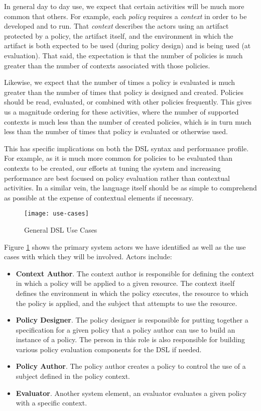 In general day to day use, we expect that certain activities will be much more common that others.  For example, each \emph{policy} requires a \emph{context} in order to be developed and to run.  That \emph{context} describes the actors using an artifact protected by a policy, the artifact itself, and the environment in which the artifact is both expected to be used (during policy design) and is being used (at evaluation).  That said, the expectation is that the number of policies is much greater than the number of contexts associated with those policies.

Likewise, we expect that the number of times a policy is evaluated is much greater than the number of times that policy is designed and created.  Policies should be read, evaluated, or combined with other policies frequently.  This gives us a magnitude ordering for these activities, where the number of supported contexts is much less than the number of created policies, which is in turn much less than the number of times that policy is evaluated or otherwise used.

This has specific implications on both the DSL syntax and performance profile.  For example, as it is much more common for policies to be evaluated than contexts to be created, our efforts at tuning the system and increasing performance are best focused on policy evaluation rather than contextual activities.  In a similar vein, the language itself should be as simple to comprehend as possible at the expense of contextual elements if necessary.

\begin{figure}[!t]
\centering
\texttt{[image: use-cases]}
\caption{General DSL Use Cases}
\label{fig:model:use-cases}
\end{figure}

Figure \ref{fig:model:use-cases} shows the primary system actors we have identified as well as the use cases with which they will be involved.  Actors include:
\begin{itemize}
\item \textbf{Context Author}.  The context author is responsible for defining the context in which a policy will be applied to a given resource.  The context itself defines the environment in which the policy executes, the resource to which the policy is applied, and the subject that attempts to use the resource.
\item \textbf{Policy Designer}.  The policy designer is responsible for putting together a specification for a given policy that a policy author can use to build an instance of a policy.  The person in this role is also responsible for building various policy evaluation components for the DSL if needed.  
\item \textbf{Policy Author}.  The policy author creates a policy to control the use of a subject defined in the policy context.
\item \textbf{Evaluator}. Another system element, an evaluator evaluates a given policy with a specific context.
\end{itemize}

